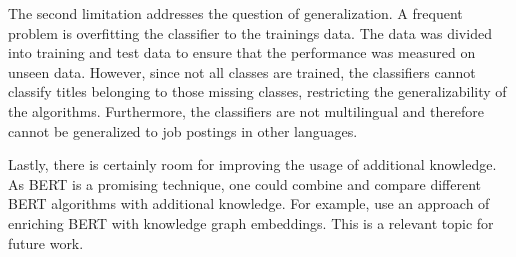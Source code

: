 \documentclass[12pt, a4paper, titlepage]{article}
\begin{document}
The second limitation addresses the question of generalization. A frequent problem is overfitting the classifier to the trainings data. The data was divided into training and test data to ensure that the performance was measured on unseen data. However, since not all classes are trained, the classifiers cannot classify titles belonging to those missing classes, restricting the generalizability of the algorithms. Furthermore, the classifiers are not multilingual and therefore cannot be generalized to job postings in other languages. 

Lastly, there is certainly room for improving the usage of additional knowledge. As \ac{BERT} is a promising technique, one could combine and compare different \ac{BERT} algorithms with additional knowledge. For example, \citet{ostendorff2019} use an approach of enriching \ac{BERT} with knowledge graph embeddings. This is a relevant topic for future work. 
\end{document}
